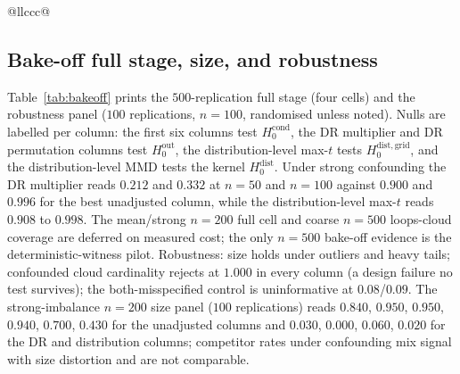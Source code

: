 \begin{table}[t]
{\begin{tabular}{@{}llccc@{}}
\\
\hline
\end{tabular}}
\caption{Weak-null size detail on the frozen finite grid, $500$ reps per size cell ($300$ per local-power cell), per-cell binomial Monte Carlo standard errors in parentheses. Null tested: $H_0^{\mathrm{dist,grid}}$. Underlined $0.096$ is the strict-gate exception at $n=200$, $r=1.0$; the same design reads $0.066$ at $n=500$. Permutation columns are diagnostics.}
\label{tab:weaknull}
\end{table}

\subsection{Bake-off full stage, size, and robustness}
\label{app:bakeoff-tab}

Table~\ref{tab:bakeoff} prints the $500$-replication full stage (four cells) and the robustness panel ($100$ replications, $n=100$, randomised unless noted). Nulls are labelled per column: the first six columns test $H_0^{\mathrm{cond}}$, the DR multiplier and DR permutation columns test $H_0^{\mathrm{out}}$, the distribution-level max-$t$ tests $H_0^{\mathrm{dist,grid}}$, and the distribution-level MMD tests the kernel $H_0^{\mathrm{dist}}$. Under strong confounding the DR multiplier reads $0.212$ and $0.332$ at $n=50$ and $n=100$ against $0.900$ and $0.996$ for the best unadjusted column, while the distribution-level max-$t$ reads $0.908$ to $0.998$. The mean/strong $n=200$ full cell and coarse $n=500$ loops-cloud coverage are deferred on measured cost; the only $n=500$ bake-off evidence is the deterministic-witness pilot. Robustness: size holds under outliers and heavy tails; confounded cloud cardinality rejects at $1.000$ in every column (a design failure no test survives); the both-misspecified control is uninformative at $0.08$/$0.09$. The strong-imbalance $n=200$ size panel ($100$ replications) reads $0.840$, $0.950$, $0.950$, $0.940$, $0.700$, $0.430$ for the unadjusted columns and $0.030$, $0.000$, $0.060$, $0.020$ for the DR and distribution columns; competitor rates under confounding mix signal with size distortion and are not comparable.

